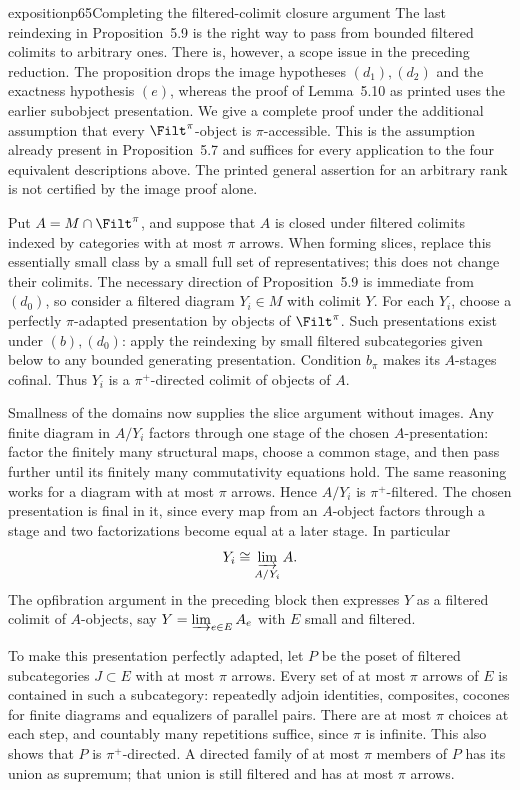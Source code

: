 \begin{dcomment}{exposition}{p65}{Completing the filtered-colimit closure argument}
The last reindexing in Proposition~5.9 is the right way to pass from bounded filtered colimits to arbitrary ones. There is, however, a scope issue in the preceding reduction. The proposition drops the image hypotheses $(d_1),(d_2)$ and the exactness hypothesis $(e)$, whereas the proof of Lemma~5.10 as printed uses the earlier subobject presentation. We give a complete proof under the additional assumption that every $\Filt^\pi$-object is $\pi$-accessible. This is the assumption already present in Proposition~5.7 and suffices for every application to the four equivalent descriptions above. The printed general assertion for an arbitrary rank is not certified by the image proof alone.

Put $A=M\cap\Filt^\pi$, and suppose that $A$ is closed under filtered colimits indexed by categories with at most $\pi$ arrows. When forming slices, replace this essentially small class by a small full set of representatives; this does not change their colimits. The necessary direction of Proposition~5.9 is immediate from $(d_0)$, so consider a filtered diagram $Y_i\in M$ with colimit $Y$. For each $Y_i$, choose a perfectly $\pi$-adapted presentation by objects of $\Filt^\pi$. Such presentations exist under $(b),(d_0)$: apply the reindexing by small filtered subcategories given below to any bounded generating presentation. Condition $b_\pi$ makes its $A$-stages cofinal. Thus $Y_i$ is a $\pi^+$-directed colimit of objects of $A$.

Smallness of the domains now supplies the slice argument without images. Any finite diagram in $A/Y_i$ factors through one stage of the chosen $A$-presentation: factor the finitely many structural maps, choose a common stage, and then pass further until its finitely many commutativity equations hold. The same reasoning works for a diagram with at most $\pi$ arrows. Hence $A/Y_i$ is $\pi^+$-filtered. The chosen presentation is final in it, since every map from an $A$-object factors through a stage and two factorizations become equal at a later stage. In particular
\[
 Y_i\cong\varinjlim_{A/Y_i}A.
\]
The opfibration argument in the preceding block then expresses $Y$ as a filtered colimit of $A$-objects, say $Y=\varinjlim_{e\in E}A_e$ with $E$ small and filtered.

To make this presentation perfectly adapted, let $P$ be the poset of filtered subcategories $J\subset E$ with at most $\pi$ arrows. Every set of at most $\pi$ arrows of $E$ is contained in such a subcategory: repeatedly adjoin identities, composites, cocones for finite diagrams and equalizers of parallel pairs. There are at most $\pi$ choices at each step, and countably many repetitions suffice, since $\pi$ is infinite. This also shows that $P$ is $\pi^+$-directed. A directed family of at most $\pi$ members of $P$ has its union as supremum; that union is still filtered and has at most $\pi$ arrows.


\end{dcomment}
